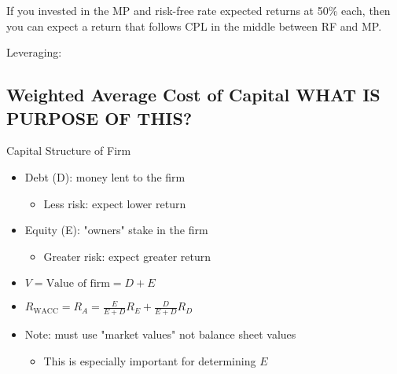     \begin{example}
        If you invested in the MP and risk-free rate expected returns at 50\% each, then you can expect a return that follows CPL in the middle between RF and MP.
    \end{example}

    \begin{example}
        Leveraging:

    \end{example}

\subsection{Weighted Average Cost of Capital WHAT IS PURPOSE OF THIS?}
\begin{definition}
    Capital Structure of Firm
\begin{itemize}
    \item Debt (D): money lent to the firm
    \begin{itemize}
        \item Less risk: expect lower return
    \end{itemize}
    \item Equity (E): "owners" stake in the firm
    \begin{itemize}
        \item Greater risk: expect greater return
    \end{itemize}
    \item $V = \text{Value of firm} = D + E$
    \item $R_{\text{WACC}} = R_A = \frac{E}{E+D} R_E + \frac{D}{E+D} R_D$
    \item Note: must use "market values" not balance sheet values
    \begin{itemize}
        \item This is especially important for determining $E$
    \end{itemize}
\end{itemize}
\end{definition}


